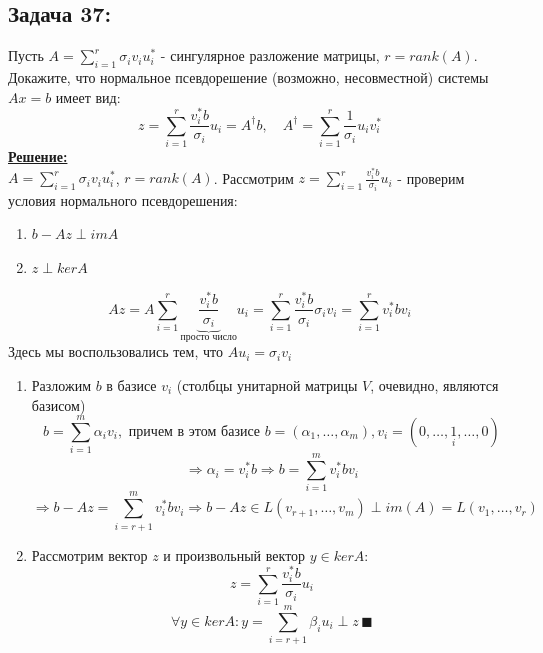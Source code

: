 \documentclass[a4paper,12pt,titlepage,final]{article}
\begin{document}
\subsection*{Задача 37:}
\noindent Пусть $A = \sum_{i=1}^{r}\sigma_i v_i u_i^*$ - сингулярное разложение матрицы, $r = rank(A)$. Докажите, что нормальное псевдорешение (возможно, несовместной) системы $Ax = b$ имеет вид:
$$ z = \sum_{i=1}^{r} \frac{v_i^* b}{\sigma_i}u_i = A^\dagger b, \quad A^\dagger = \sum_{i=1}^{r} \frac{1}{\sigma_i}u_i v_i^* $$
\textbf{\underline{Решение:}} \\
$A = \sum_{i=1}^r\sigma_i v_i u_i^*$, $r = rank(A)$. Рассмотрим $z = \sum_{i=1}^{r} \frac{v_i^* b}{\sigma_i}u_i$ - проверим условия нормального псевдорешения:
\begin{enumerate}
    \item $b - Az \perp imA$ \item $z \perp kerA$
\end{enumerate}
$$ Az = A\sum_{i=1}^{r} \!\!\!\!\!\!\underbrace{\frac{v_i^* b}{\sigma_i}}_{\text{просто число}}\!\!\!\!\!\!\!u_i = \sum_{i=1}^{r} \frac{v_i^* b}{\sigma_i}\sigma_i v_i = \sum_{i=1}^{r} v_i^* b v_i$$
Здесь мы воспользовались тем, что $Au_i = \sigma_i v_i$
\begin{enumerate}
    \item Разложим $b$ в базисе $v_i$ (столбцы унитарной матрицы $V$, очевидно, являются базисом)
    $$b = \sum_{i=1}^m \alpha_i v_i, \text{ причем в этом базисе } b = (\alpha_1, \ldots, \alpha_m), v_i = (0, \ldots,\underset{i}{1},\ldots, 0)$$
    $$\Rightarrow \alpha_i = v_i^* b \Rightarrow b = \sum_{i=1}^m v_i^* b v_i$$
    $$\Rightarrow b - Az = \sum_{i=r+1}^m v_i^* b v_i \Rightarrow b - Az \in L(v_{r+1}, \ldots, v_m) \perp im(A) = L(v_1, \ldots, v_r)$$
    \item Рассмотрим вектор $z$ и произвольный вектор $y \in kerA$: 
    $$z = \sum_{i=1}^r \frac{v_i^* b}{\sigma_i}u_i$$ 
    $$\forall y \in kerA: y = \sum_{i=r+1}^m \beta_i u_i \perp z \, \blacksquare$$
\end{enumerate}

\end{document}
